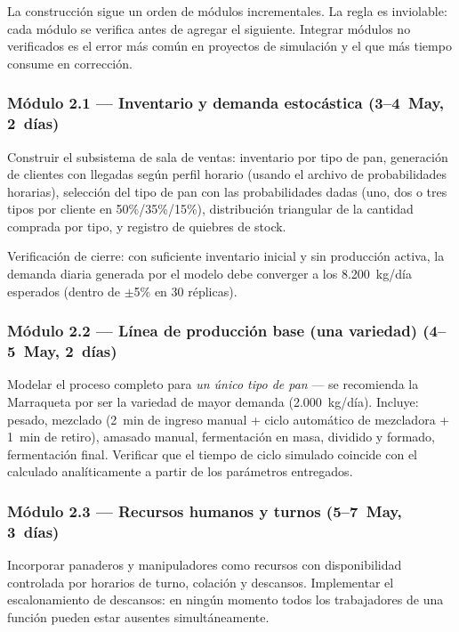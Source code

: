 \documentclass[12pt]{article}
\begin{document}
La construcción sigue un orden de módulos incrementales. La regla es inviolable: cada módulo se verifica antes de agregar el siguiente. Integrar módulos no verificados es el error más común en proyectos de simulación y el que más tiempo consume en corrección.

\subsubsection{Módulo 2.1 --- Inventario y demanda estocástica \quad(3--4~May, 2~días)}

Construir el subsistema de sala de ventas: inventario por tipo de pan, generación de clientes con llegadas según perfil horario (usando el archivo de probabilidades horarias), selección del tipo de pan con las probabilidades dadas (uno, dos o tres tipos por cliente en 50\%/35\%/15\%), distribución triangular de la cantidad comprada por tipo, y registro de quiebres de stock.

Verificación de cierre: con suficiente inventario inicial y sin producción activa, la demanda diaria generada por el modelo debe converger a los 8.200~kg/día esperados (dentro de $\pm$5\% en 30 réplicas).

\subsubsection{Módulo 2.2 --- Línea de producción base (una variedad) \quad(4--5~May, 2~días)}

Modelar el proceso completo para \textit{un único tipo de pan} --- se recomienda la Marraqueta por ser la variedad de mayor demanda (2.000~kg/día). Incluye: pesado, mezclado (2~min de ingreso manual + ciclo automático de mezcladora + 1~min de retiro), amasado manual, fermentación en masa, dividido y formado, fermentación final. Verificar que el tiempo de ciclo simulado coincide con el calculado analíticamente a partir de los parámetros entregados.

\subsubsection{Módulo 2.3 --- Recursos humanos y turnos \quad(5--7~May, 3~días)}

Incorporar panaderos y manipuladores como recursos con disponibilidad controlada por horarios de turno, colación y descansos. Implementar el escalonamiento de descansos: en ningún momento todos los trabajadores de una función pueden estar ausentes simultáneamente.
\end{document}
